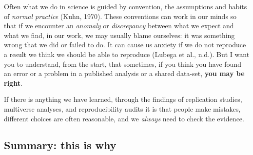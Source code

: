 \documentclass[
  letterpaper,
  DIV=11,
  numbers=noendperiod]{scrreprt}
\begin{document}
Often what we do in science is guided by convention, the assumptions and
habits of \emph{normal practice} (Kuhn, 1970). These conventions can
work in our minds so that if we encounter an \emph{anomaly} or
\emph{discrepancy} between what we expect and what we find, in our work,
we may usually blame ourselves: it was something wrong that we did or
failed to do. It can cause us anxiety if we do not reproduce a result we
think we should be able to reproduce (Lubega et al., n.d.). But I want
you to understand, from the start, that sometimes, if you think you have
found an error or a problem in a published analysis or a shared
data-set, \textbf{you may be right}.

If there is anything we have learned, through the findings of
replication studies, multiverse analyses, and reproducibility audits it
is that people make mistakes, different choices are often reasonable,
and we \emph{always} need to check the evidence.

\hypertarget{summary-this-is-why}{%
\subsection{Summary: this is why}\label{summary-this-is-why}}
\end{document}

